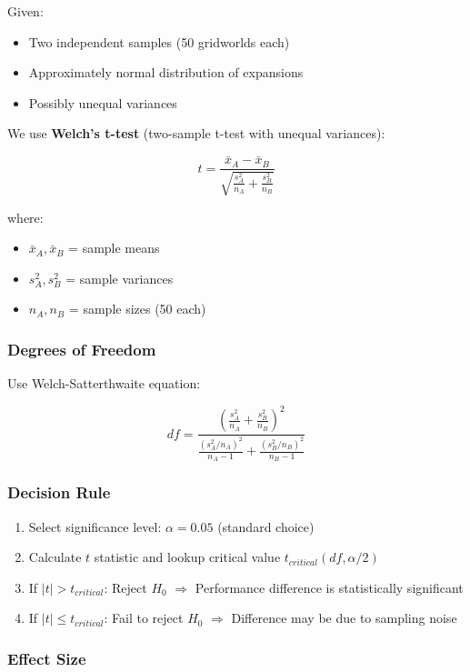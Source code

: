 \documentclass[12pt]{article}
\begin{document}
Given:
\begin{itemize}
    \item Two independent samples (50 gridworlds each)
    \item Approximately normal distribution of expansions
    \item Possibly unequal variances
\end{itemize}

We use \textbf{Welch's t-test} (two-sample t-test with unequal variances):

$$t = \frac{\bar{x}_A - \bar{x}_B}{\sqrt{\frac{s_A^2}{n_A} + \frac{s_B^2}{n_B}}}$$

where:
\begin{itemize}
    \item $\bar{x}_A, \bar{x}_B$ = sample means
    \item $s_A^2, s_B^2$ = sample variances  
    \item $n_A, n_B$ = sample sizes (50 each)
\end{itemize}

\subsubsection{Degrees of Freedom}

Use Welch-Satterthwaite equation:

$$df = \frac{(\frac{s_A^2}{n_A} + \frac{s_B^2}{n_B})^2}{\frac{(s_A^2/n_A)^2}{n_A-1} + \frac{(s_B^2/n_B)^2}{n_B-1}}$$

\subsubsection{Decision Rule}

\begin{enumerate}
    \item Select significance level: $\alpha = 0.05$ (standard choice)
    \item Calculate $t$ statistic and lookup critical value $t_{critical}(df, \alpha/2)$
    \item If $|t| > t_{critical}$: Reject $H_0$ $\Rightarrow$ Performance difference is statistically significant
    \item If $|t| \leq t_{critical}$: Fail to reject $H_0$ $\Rightarrow$ Difference may be due to sampling noise
\end{enumerate}

\subsubsection{Effect Size}
\end{document}
